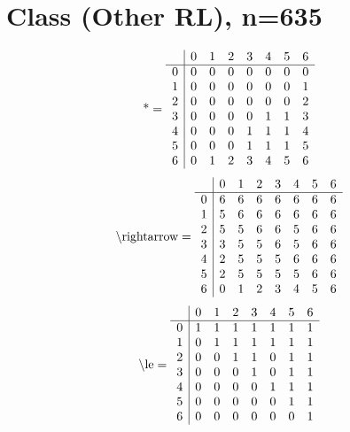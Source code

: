 \documentclass[11pt]{article}
\begin{document}
\section{Class (Other RL), n=635}
\[\text{*} = 
\begin{array}{r | r r r r r r r}
 & 0 & 1 & 2 & 3 & 4 & 5 & 6 \\ \hline
0 & 0 & 0 & 0 & 0 & 0 & 0 & 0 \\
1 & 0 & 0 & 0 & 0 & 0 & 0 & 1 \\
2 & 0 & 0 & 0 & 0 & 0 & 0 & 2 \\
3 & 0 & 0 & 0 & 0 & 1 & 1 & 3 \\
4 & 0 & 0 & 0 & 1 & 1 & 1 & 4 \\
5 & 0 & 0 & 0 & 1 & 1 & 1 & 5 \\
6 & 0 & 1 & 2 & 3 & 4 & 5 & 6 \\
\end{array}
\]
\[\text{\textbackslash rightarrow} = 
\begin{array}{r | r r r r r r r}
 & 0 & 1 & 2 & 3 & 4 & 5 & 6 \\ \hline
0 & 6 & 6 & 6 & 6 & 6 & 6 & 6 \\
1 & 5 & 6 & 6 & 6 & 6 & 6 & 6 \\
2 & 5 & 5 & 6 & 6 & 5 & 6 & 6 \\
3 & 3 & 5 & 5 & 6 & 5 & 6 & 6 \\
4 & 2 & 5 & 5 & 5 & 6 & 6 & 6 \\
5 & 2 & 5 & 5 & 5 & 5 & 6 & 6 \\
6 & 0 & 1 & 2 & 3 & 4 & 5 & 6 \\
\end{array}
\]
\[\text{\textbackslash le} = 
\begin{array}{r | r r r r r r r}
 & 0 & 1 & 2 & 3 & 4 & 5 & 6 \\ \hline
0 & 1 & 1 & 1 & 1 & 1 & 1 & 1 \\
1 & 0 & 1 & 1 & 1 & 1 & 1 & 1 \\
2 & 0 & 0 & 1 & 1 & 0 & 1 & 1 \\
3 & 0 & 0 & 0 & 1 & 0 & 1 & 1 \\
4 & 0 & 0 & 0 & 0 & 1 & 1 & 1 \\
5 & 0 & 0 & 0 & 0 & 0 & 1 & 1 \\
6 & 0 & 0 & 0 & 0 & 0 & 0 & 1 \\
\end{array}
\]
\end{document}
